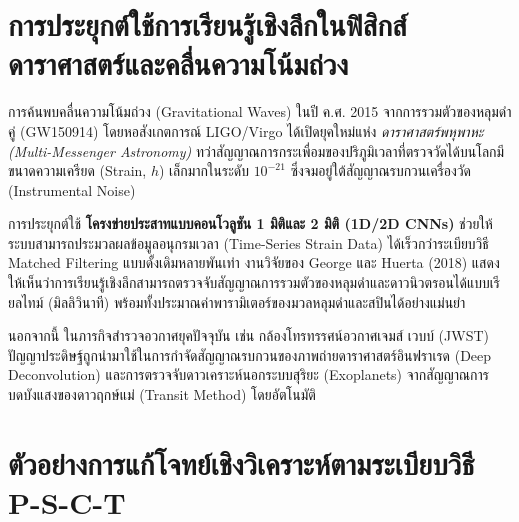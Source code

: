 \section{การประยุกต์ใช้การเรียนรู้เชิงลึกในฟิสิกส์ดาราศาสตร์และคลื่นความโน้มถ่วง}

การค้นพบคลื่นความโน้มถ่วง (Gravitational Waves) ในปี ค.ศ. 2015 จากการรวมตัวของหลุมดำคู่ (GW150914) โดยหอสังเกตการณ์ LIGO/Virgo ได้เปิดยุคใหม่แห่ง \textit{ดาราศาสตร์พหุพาหะ (Multi-Messenger Astronomy)} ทว่าสัญญาณการกระเพื่อมของปริภูมิเวลาที่ตรวจวัดได้บนโลกมีขนาดความเครียด (Strain, $h$) เล็กมากในระดับ $10^{-21}$ ซึ่งจมอยู่ใต้สัญญาณรบกวนเครื่องวัด (Instrumental Noise)

การประยุกต์ใช้ \textbf{โครงข่ายประสาทแบบคอนโวลูชัน 1 มิติและ 2 มิติ (1D/2D CNNs)} ช่วยให้ระบบสามารถประมวลผลข้อมูลอนุกรมเวลา (Time-Series Strain Data) ได้เร็วกว่าระเบียบวิธี Matched Filtering แบบดั้งเดิมหลายพันเท่า งานวิจัยของ George และ Huerta (2018) แสดงให้เห็นว่าการเรียนรู้เชิงลึกสามารถตรวจจับสัญญาณการรวมตัวของหลุมดำและดาวนิวตรอนได้แบบเรียลไทม์ (มิลลิวินาที) พร้อมทั้งประมาณค่าพารามิเตอร์ของมวลหลุมดำและสปินได้อย่างแม่นยำ

นอกจากนี้ ในภารกิจสำรวจอวกาศยุคปัจจุบัน เช่น กล้องโทรทรรศน์อวกาศเจมส์ เวบบ์ (JWST) ปัญญาประดิษฐ์ถูกนำมาใช้ในการกำจัดสัญญาณรบกวนของภาพถ่ายดาราศาสตร์อินฟราเรด (Deep Deconvolution) และการตรวจจับดาวเคราะห์นอกระบบสุริยะ (Exoplanets) จากสัญญาณการบดบังแสงของดาวฤกษ์แม่ (Transit Method) โดยอัตโนมัติ

\section{ตัวอย่างการแก้โจทย์เชิงวิเคราะห์ตามระเบียบวิธี P-S-C-T}

